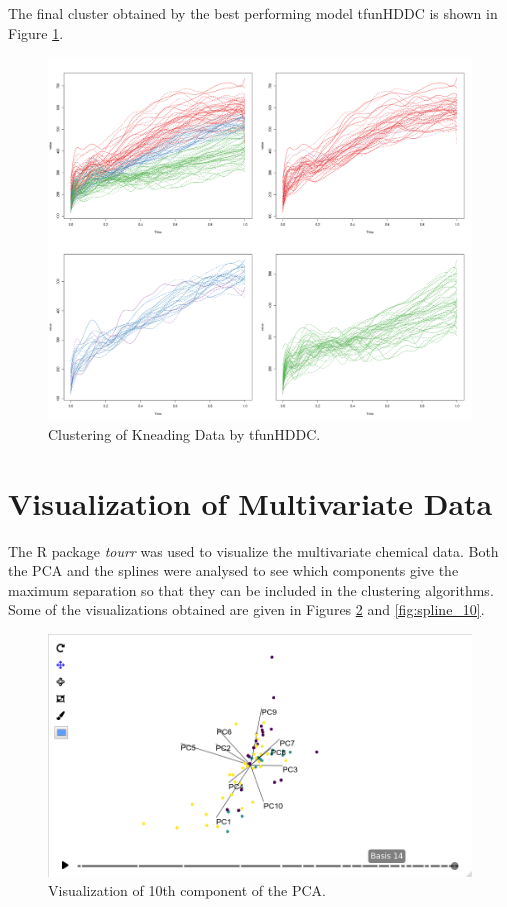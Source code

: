 \documentclass[]{article}
\begin{document}
The final cluster obtained by the best performing model tfunHDDC is shown in Figure \ref{fig:kneading_cluster}.

\begin{figure}
	\centering
	\includegraphics[scale=0.25]{kneading_cluster.png}
	\caption{Clustering of Kneading Data by tfunHDDC.}
	\label{fig:kneading_cluster}
\end{figure}



\section{Visualization of Multivariate Data}

The R package \emph{tourr} was used to visualize the multivariate chemical data. Both the PCA and the splines were analysed to see which components give the maximum separation so that they can be included in the clustering algorithms. Some of the visualizations obtained are given in Figures \ref{fig:pca_10} and \ref{fig:spline_10}.

\begin{figure}
	\centering
	\includegraphics[scale=0.35]{pca_10.png}
	\caption{Visualization of 10th component of the PCA.}
	\label{fig:pca_10}
\end{figure}
\end{document}
